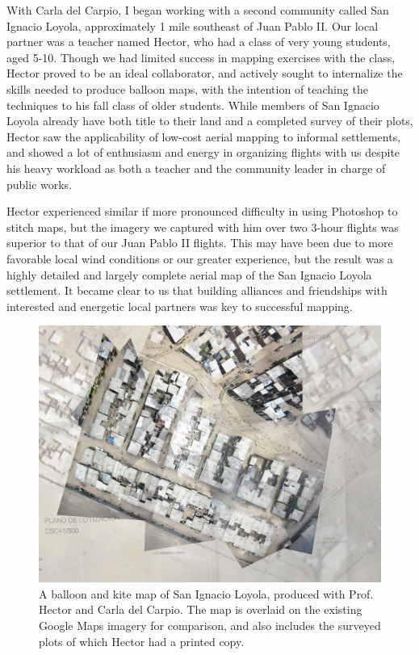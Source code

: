 \documentclass[11pt]{report}
\begin{document}
With Carla del Carpio, I began working with a second community called San Ignacio Loyola, approximately 1 mile southeast of Juan Pablo II. Our local partner was a teacher named Hector, who had a class of very young students, aged 5-10. Though we had limited success in mapping exercises with the class, Hector proved to be an ideal collaborator, and actively sought to internalize the skills needed to produce balloon maps, with the intention of teaching the techniques to his fall class of older students. While members of San Ignacio Loyola already have both title to their land and a completed survey of their plots, Hector saw the applicability of low-cost aerial mapping to informal settlements, and showed a lot of enthusiasm and energy in organizing flights with us despite his heavy workload as both a teacher and the community leader in charge of public works. 

Hector experienced similar if more pronounced difficulty in using Photoshop to stitch maps, but the imagery we captured with him over two 3-hour flights was superior to that of our Juan Pablo II flights. This may have been due to more favorable local wind conditions or our greater experience, but the result was a highly detailed and largely complete aerial map of the San Ignacio Loyola settlement. It became clear to us that building alliances and friendships with interested and energetic local partners was key to successful mapping.

\begin{figure}[h]
  \begin{center}
	\includegraphics[width=1\textwidth]{images/san-ignacio-loyola-map.jpg}
	\caption{A balloon and kite map of San Ignacio Loyola, produced with Prof. Hector and Carla del Carpio. The map is overlaid on the existing Google Maps imagery for comparison, and also includes the surveyed plots of which Hector had a printed copy.}
  \end{center}
\end{figure}
\end{document}
